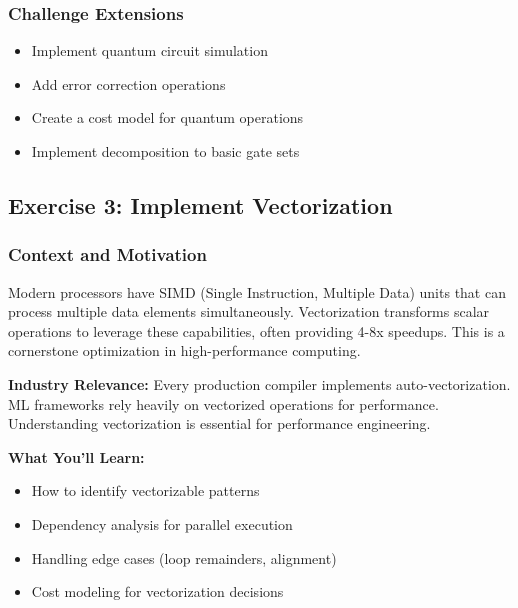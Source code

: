 \documentclass[11pt,a4paper]{article}
\begin{document}
\subsubsection{Challenge Extensions}
\begin{itemize}
    \item Implement quantum circuit simulation
    \item Add error correction operations
    \item Create a cost model for quantum operations
    \item Implement decomposition to basic gate sets
\end{itemize}

\subsection{Exercise 3: Implement Vectorization}

\subsubsection{Context and Motivation}

Modern processors have SIMD (Single Instruction, Multiple Data) units that can process multiple data elements simultaneously. Vectorization transforms scalar operations to leverage these capabilities, often providing 4-8x speedups. This is a cornerstone optimization in high-performance computing.

\textbf{Industry Relevance:} Every production compiler implements auto-vectorization. ML frameworks rely heavily on vectorized operations for performance. Understanding vectorization is essential for performance engineering.

\textbf{What You'll Learn:}
\begin{itemize}
    \item How to identify vectorizable patterns
    \item Dependency analysis for parallel execution
    \item Handling edge cases (loop remainders, alignment)
    \item Cost modeling for vectorization decisions
\end{itemize}
\end{document}
